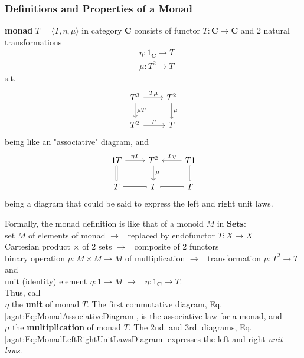 \subsubsection{Definitions and Properties of a Monad}

\begin{definition}[Monad]\label{agat:Def:Monad}
\textbf{monad} $T = \langle T, \eta, \mu \rangle$ in category $\mathbf{C}$ consists of functor $T: \mathbf{C} \to \mathbf{C}$ and 2 natural transformations
\begin{equation}
\begin{aligned}
& \eta : 1_{\mathbf{C}} \to T \\ 
& \mu : T^2 \to T
\end{aligned}
\end{equation}	
s.t. 
\begin{equation}\label{agat:Eq:MonadAssociativeDiagram}
\begin{tikzcd}
T^3 \arrow{d}{\mu T} \arrow{r}{T\mu} & T^2 \arrow{d}{\mu} \\
T^2 \arrow{r}{\mu} & T
\end{tikzcd}
\end{equation}
being like an "associative" diagram, and 
\begin{equation}\label{agat:Eq:MonadLeftRightUnitLawsDiagram}
\begin{tikzcd}
	1T \arrow[equal]{d} \arrow{r}{\eta T} & T^2 \arrow{d}{\mu} & T1 \arrow{l}[swap]{T \eta} \arrow[equal]{d} \\
	T \arrow[equal]{r} & T & T \arrow[equal]{l}
\end{tikzcd}
\end{equation}
being a diagram that could be said to express the left and right unit laws.
\end{definition} 

Formally, the monad definition is like that of a monoid $M$ in $\mathbf{Sets}$: \\
set $M$ of elements of monad \quad $\to $ \, replaced by endofunctor $T : X \to X$ \\
Cartesian product $\times$ of 2 sets \quad $\to $ \, composite of 2 functors \\
binary operation $\mu : M \times M \to M$ of multiplication \quad $\to $ \, transformation $\mu : T^2 \to T$ and \\
unit (identity) element $\eta:1 \to M$ \quad $\to $ \, $\eta : 1_{\mathbf{C}} \to T$. \\

Thus, call \\
$\eta$ the \textbf{unit} of monad $T$. The first commutative diagram, Eq. \ref{agat:Eq:MonadAssociativeDiagram}, is the associative law for a monad, and \\
$\mu$ the \textbf{multiplication} of monad $T$. The 2nd. and 3rd. diagrams, Eq. \ref{agat:Eq:MonadLeftRightUnitLawsDiagram} expresses the left and right \emph{unit laws}.

